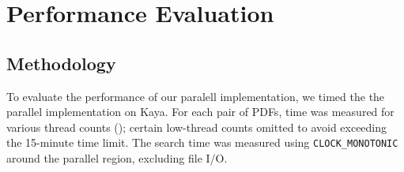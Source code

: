 \documentclass[11pt,a4paper]{article}
\begin{document}
\newpage
\section{Performance Evaluation}
\label{sec:perf}


\subsection{Methodology}

To evaluate the performance of our paralell implementation, we timed the the parallel implementation on Kaya. For each pair of PDFs, time was measured for various thread counts (); certain low-thread counts omitted to avoid exceeding the 15-minute time limit. The search time was measured using \texttt{CLOCK\_MONOTONIC} around the parallel region, excluding file I/O.
\end{document}
